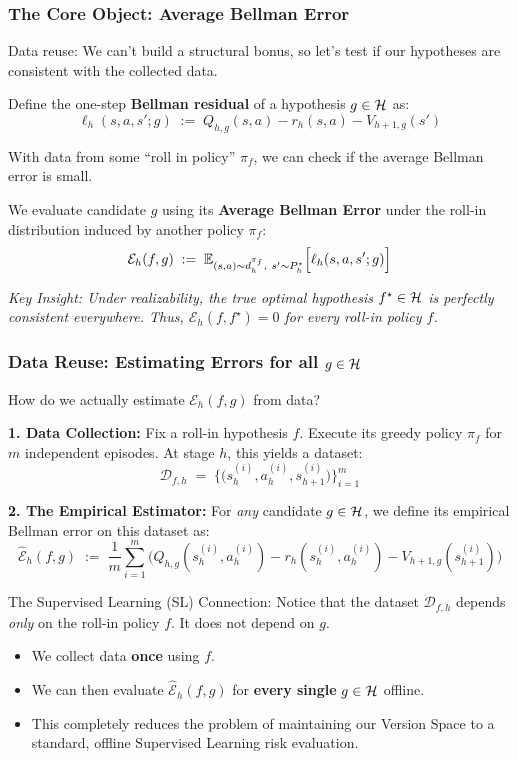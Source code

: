\documentclass[aspectratio=169]{beamer}
\begin{document}
\begin{frame}\frametitle{The Core Object: Average Bellman Error}

Data reuse: We can't build a structural bonus, so let's test if our hypotheses are
consistent with the collected data.

\vspace{0.1cm}
Define the one-step \textbf{Bellman residual} of a hypothesis $g \in \mathcal{H}$ as:
\[
\ell_h(s,a,s';g) \;:=\; Q_{h,g}(s,a) - r_h(s,a) - V_{h+1,g}(s')
\]

\pause
\vspace{0.1cm}
With data from some ``roll in policy'' $\pi_f$, we can check if the
average Bellman error is small.

\vspace{0.1cm}
We evaluate candidate $g$ using its \textbf{Average Bellman Error} under the roll-in distribution induced by another policy $\pi_f$:
\[
\mathcal{E}_h(f,g) \;:=\; \mathbb{E}_{(s,a)\sim d_h^{\pi_f},\ s'\sim P_h^\star}\Big[\ell_h(s,a,s';g)\Big]
\]

\pause
\vspace{0.1cm}
\textit{Key Insight: Under realizability, the true optimal hypothesis $f^\star \in \mathcal{H}$ is perfectly consistent everywhere. Thus, $\mathcal{E}_h(f, f^\star) = 0$ for \emph{every} roll-in policy $f$.}
\end{frame}


\begin{frame}\frametitle{Data Reuse: Estimating Errors for all $g \in \mathcal{H}$}

How do we actually estimate $\mathcal{E}_h(f,g)$ from data? 

\vspace{0.2cm}
\textbf{1. Data Collection:} 
Fix a roll-in hypothesis $f$. Execute its greedy policy $\pi_f$ for $m$ independent episodes. At stage $h$, this yields a dataset:
\[
\mathcal{D}_{f, h} \;=\; \Big\{ \big( s_h^{(i)}, a_h^{(i)}, s_{h+1}^{(i)} \big) \Big\}_{i=1}^m
\]

\pause
\vspace{0.2cm}
\textbf{2. The Empirical Estimator:} 
For \emph{any} candidate $g \in \mathcal{H}$, we define its empirical Bellman error on this dataset as:
\[
\widehat{\mathcal{E}}_h(f, g) \;:=\; \frac{1}{m} \sum_{i=1}^m \Big( Q_{h,g}(s_h^{(i)}, a_h^{(i)}) - r_h(s_h^{(i)}, a_h^{(i)}) - V_{h+1,g}(s_{h+1}^{(i)}) \Big)
\]

\pause
\vspace{0.4cm}
\alert{The Supervised Learning (SL) Connection:} 
Notice that the dataset $\mathcal{D}_{f, h}$ depends \emph{only} on the roll-in policy $f$. It does not depend on $g$. 
\begin{itemize}
    \item We collect data \textbf{once} using $f$.
    \item We can then evaluate $\widehat{\mathcal{E}}_h(f, g)$ for \textbf{every single} $g \in \mathcal{H}$ offline.
    \item This completely reduces the problem of maintaining our Version Space to a standard, offline Supervised Learning risk evaluation.
\end{itemize}
\end{frame}
\end{document}
